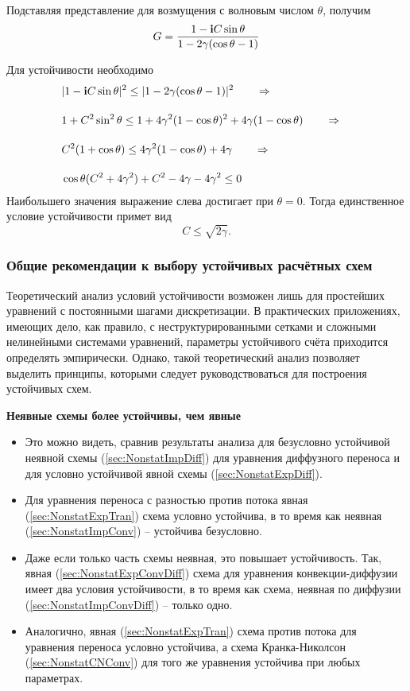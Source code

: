 Подставляя представление для возмущения с волновым числом $\theta$, получим
\begin{equation*}
    G = \frac{1 - \mathbf{i} C \sin\theta}{1 - 2\gamma(\cos\theta - 1)}
\end{equation*}

Для устойчивости необходимо
\begin{align*}
    & |1 - \mathbf{i} C \sin\theta|^2 \leq |1 - 2\gamma(\cos\theta - 1)|^2 \quad \quad\Rightarrow\quad \\[10pt]
    & 1 + C^2\sin^2\theta \leq 1 + 4\gamma^2(1 - \cos\theta)^2 + 4\gamma(1-\cos\theta) \quad \quad\Rightarrow\quad \\[10pt]
    & C^2(1 + \cos\theta) \leq 4\gamma^2(1 - \cos\theta) + 4\gamma \quad \quad\Rightarrow\quad \\[10pt]
    & \cos\theta(C^2 + 4\gamma^2) + C^2 - 4\gamma - 4\gamma^2 \leq 0
\end{align*}
Наибольшего значения выражение слева достигает при $\theta = 0$. Тогда единственное условие устойчивости 
примет вид
\begin{equation*}
    C \leq \sqrt{2\gamma}.
\end{equation*}

\subsubsection{Общие рекомендации к выбору устойчивых расчётных схем}
Теоретический анализ условий устойчивости возможен
лишь для простейших уравнений с постоянными шагами дискретизации.
В практических приложениях, имеющих дело, как правило,
с неструктурированными сетками и сложными нелинейными системами уравнений,
параметры устойчивого счёта приходится определять эмпирически.
Однако, такой теоретический анализ позволяет выделить принципы, которыми
следует руководствоваться для построения устойчивых схем.

{\bf Неявные схемы более устойчивы, чем явные}
\begin{itemize}
\item
Это можно видеть, сравнив результаты анализа
для безусловно устойчивой неявной схемы (\ref{sec:NonstatImpDiff}) для уравнения диффузного переноса и
для условно устойчивой явной схемы (\ref{sec:NonstatExpDiff}).
\item
Для уравнения переноса с разностью против потока
явная (\ref{sec:NonstatExpTran}) схема условно устойчива, в то время как
неявная (\ref{sec:NonstatImpConv}) -- устойчива безусловно.
\item
Даже если только часть схемы неявная, это повышает устойчивость.
Так,  явная (\ref{sec:NonstatExpConvDiff}) схема для уравнения конвекции-диффузии
имеет два условия устойчивости, в то время как
схема, неявная по диффузии (\ref{sec:NonstatImpConvDiff}) -- только одно.
\item
Аналогично,  явная (\ref{sec:NonstatExpTran}) схема против потока для
уравнения переноса условно устойчива,
а схема Кранка-Николсон (\ref{sec:NonstatCNConv}) для того же уравнения устойчива при любых параметрах.
\end{itemize}

